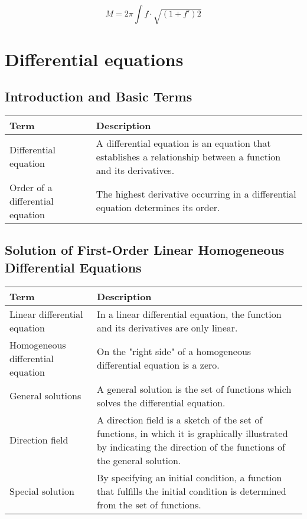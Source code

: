 \documentclass{book}
\begin{document}
\[
  M = 2 \pi \int f \cdot \sqrt{(1+ f')2}
\]

\chapter{Differential equations}

\section{Introduction and Basic Terms}

\begin{tabular}{p{3cm}p{10.5cm}}
  \toprule
  \textbf{Term} & \textbf{Description} \\
  \midrule
  Differential equation & A differential equation is an equation that establishes a relationship between a function and its derivatives.\\
  \midrule
  Order of a differential equation & The highest derivative occurring in a differential equation determines its order.\\
  \bottomrule
\end{tabular}


\section{Solution of First-Order Linear Homogeneous Differential Equations}

\begin{tabular}{p{3cm}p{10.5cm}}
  \toprule
  \textbf{Term} & \textbf{Description} \\
  \midrule
  Linear differential equation & In a linear differential equation, the function and its derivatives are only linear.\\
  \midrule
  Homogeneous differential equation & On the "right side" of a homogeneous differential equation is a zero.\\
  \midrule
  General solutions & A general solution is the set of functions which solves the differential equation.\\
  \midrule
  Direction field & A direction field is a sketch of the set of functions, in which it is graphically illustrated by indicating the direction of the functions of the general solution.\\
  \midrule
  Special solution & By specifying an initial condition, a function that fulfills the initial condition is determined from the set of functions.\\
  \bottomrule
\end{tabular}
\end{document}
